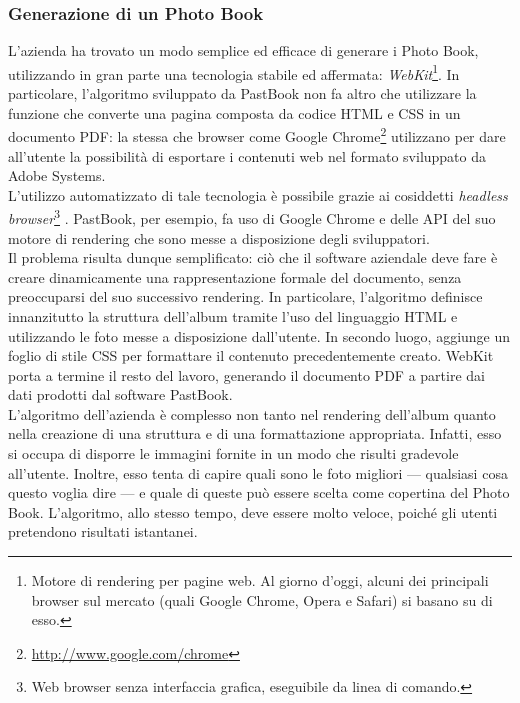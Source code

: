 			\subsubsection{Generazione di un Photo Book}
				L'azienda ha trovato un modo semplice ed efficace di generare i Photo Book, utilizzando in gran parte una tecnologia
				stabile ed affermata: \emph{WebKit}\footnote{Motore di rendering per pagine web. Al giorno d'oggi, alcuni dei principali browser sul mercato (quali Google Chrome, Opera e Safari) si
basano su di esso.}. In particolare, l'algoritmo sviluppato da
				PastBook non fa altro che utilizzare la funzione che converte una pagina composta da codice HTML e CSS in un
				documento PDF: la stessa che browser come Google Chrome\footnote{\url{http://www.google.com/chrome}} utilizzano per dare
				all'utente la possibilità di esportare i contenuti web nel formato sviluppato da Adobe Systems.\\
				L'utilizzo automatizzato di tale tecnologia è possibile grazie ai cosiddetti
				\emph{headless browser}\footnote{Web browser senza interfaccia grafica, eseguibile da linea di comando.} . PastBook, per esempio, fa uso di Google Chrome
				e delle API del suo motore di rendering che sono messe a disposizione degli sviluppatori.\\
				Il problema risulta dunque semplificato: ciò che il software aziendale deve fare è creare dinamicamente una
				rappresentazione formale del documento, senza preoccuparsi del suo successivo rendering. In particolare, l'algoritmo
				definisce innanzitutto la struttura dell'album tramite l'uso del linguaggio HTML e utilizzando le foto messe a
				disposizione dall'utente. In secondo luogo, aggiunge un foglio di stile CSS per formattare il contenuto
				precedentemente creato. WebKit porta a termine il resto del lavoro, generando il documento PDF a partire dai dati
				prodotti dal software PastBook.\\
				L'algoritmo dell'azienda è complesso non tanto nel rendering dell'album quanto nella creazione di una struttura e di
				una formattazione appropriata. Infatti, esso si occupa di disporre le immagini fornite in un modo che risulti
				gradevole all'utente. Inoltre, esso tenta di capire quali sono le foto migliori — qualsiasi cosa questo voglia dire —
				e quale di queste può essere scelta come copertina del Photo Book. L'algoritmo, allo stesso tempo, deve essere molto
				veloce, poiché gli utenti pretendono risultati istantanei.

